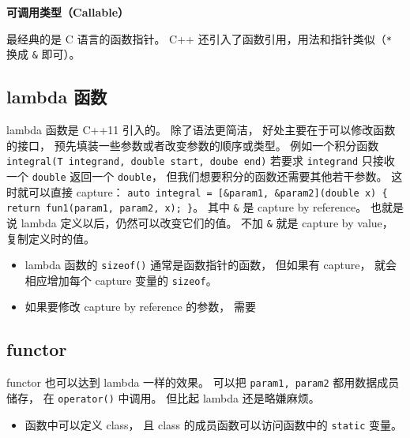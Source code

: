 

\textbf{可调用类型（Callable）}

最经典的是 C 语言的函数指针。 C++ 还引入了函数引用，用法和指针类似（\verb|*| 换成 \verb|&| 即可）。

\subsection{lambda 函数}
lambda 函数是 C++11 引入的。 除了语法更简洁， 好处主要在于可以修改函数的接口， 预先填装一些参数或者改变参数的顺序或类型。 例如一个积分函数 \verb|integral(T integrand, double start, doube end)| 若要求 \verb|integrand| 只接收一个 \verb|double| 返回一个 \verb|double|， 但我们想要积分的函数还需要其他若干参数。 这时就可以直接 capture： \verb|auto integral = [&param1, &param2](double x) { return fun1(param1, param2, x); }|。 其中 \verb|&| 是 capture by reference。 也就是说 lambda 定义以后，仍然可以改变它们的值。 不加 \verb|&| 就是 capture by value， 复制定义时的值。

\begin{itemize}
\item lambda 函数的 \verb|sizeof()| 通常是函数指针的函数， 但如果有 capture， 就会相应增加每个 capture 变量的 \verb|sizeof|。
\item 如果要修改 capture by reference 的参数， 需要
\end{itemize}

\subsection{functor}
functor 也可以达到 lambda 一样的效果。 可以把 \verb|param1, param2| 都用数据成员储存， 在 \verb|operator()| 中调用。 但比起 lambda 还是略嫌麻烦。

\begin{itemize}
\item 函数中可以定义 class， 且 class 的成员函数可以访问函数中的 \verb|static| 变量。
\end{itemize}
